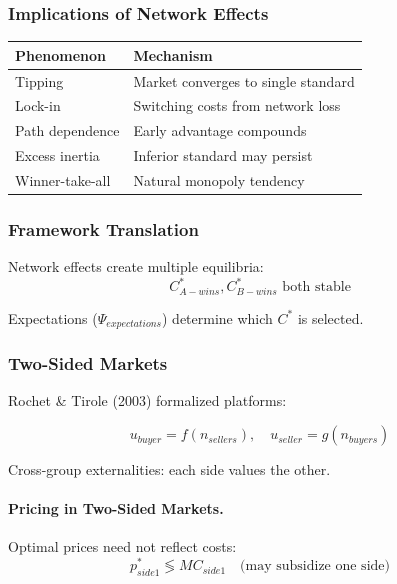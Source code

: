 \subsubsection{Implications of Network Effects}

\begin{center}
\renewcommand{\arraystretch}{1.3}
\begin{tabular}{|l|l|}
\hline
\textbf{Phenomenon} & \textbf{Mechanism} \\
\hline
Tipping & Market converges to single standard \\
Lock-in & Switching costs from network loss \\
Path dependence & Early advantage compounds \\
Excess inertia & Inferior standard may persist \\
Winner-take-all & Natural monopoly tendency \\
\hline
\end{tabular}
\end{center}

\subsubsection{Framework Translation}

Network effects create multiple equilibria:
\begin{equation}
C^*_{A-wins}, C^*_{B-wins} \text{ both stable}
\end{equation}

Expectations ($\Psi_{expectations}$) determine which $C^*$ is selected.

\subsubsection{Two-Sided Markets}

Rochet \& Tirole (2003) formalized platforms:

\begin{equation}
\boxed{
u_{buyer} = f(n_{sellers}), \quad u_{seller} = g(n_{buyers})
}
\label{eq:twosided}
\end{equation}

Cross-group externalities: each side values the other.

\paragraph{Pricing in Two-Sided Markets.}
Optimal prices need not reflect costs:
\begin{equation}
p_{side1}^* \lessgtr MC_{side1} \quad \text{(may subsidize one side)}
\end{equation}

